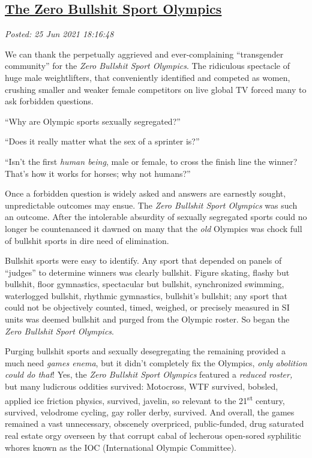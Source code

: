 %

\subsection*{\href{http://analyzethedatanotthedrivel.org/2021/06/25/the-zero-bullshit-sport-olympics/}{The Zero Bullshit Sport Olympics}}


\noindent\emph{Posted: 25 Jun 2021 18:16:48}
\vspace{6pt}

We can thank the perpetually aggrieved and ever-complaining
``transgender community'' for the \emph{Zero Bullshit Sport Olympics}.
The ridiculous spectacle of huge male weightlifters, that conveniently
identified and competed as women, crushing smaller and weaker female
competitors on live global TV forced many to ask forbidden questions.

``Why are Olympic sports sexually segregated?''

``Does it really matter what the sex of a sprinter is?''

``Isn't the first \emph{human being}, male or female, to cross the
finish line the winner? That's how it works for horses; why not
humans?''

Once a forbidden question is widely asked and answers are earnestly
sought, unpredictable outcomes may ensue. The \emph{Zero Bullshit Sport
Olympics} was such an outcome. After the intolerable absurdity of
sexually segregated sports could no longer be countenanced it dawned on
many that the \emph{old} Olympics was chock full of bullshit sports in
dire need of elimination.

Bullshit sports were easy to identify. Any sport that depended on panels
of ``judges'' to determine winners was clearly bullshit. Figure skating,
flashy but bullshit, floor gymnastics, spectacular but bullshit,
synchronized swimming, waterlogged bullshit, rhythmic gymnastics,
bullshit's bullshit; any sport that could not be objectively counted,
timed, weighed, or precisely measured in SI units was deemed bullshit
and purged from the Olympic roster. So began the \emph{Zero Bullshit
Sport Olympics}.

Purging bullshit sports and sexually desegregating the remaining
provided a much need \emph{games enema}, but it didn't completely fix
the Olympics, \emph{only abolition could do that}! Yes, the \emph{Zero
Bullshit Sport Olympics} featured a \emph{reduced roster,} but many
ludicrous oddities survived: Motocross, WTF survived, bobsled, applied
ice friction physics, survived, javelin, so relevant to the
21\textsuperscript{st} century, survived, velodrome cycling, gay roller
derby, survived. And overall, the games remained a vast unnecessary,
obscenely overpriced, public-funded, drug saturated real estate orgy
overseen by that corrupt cabal of lecherous open-sored syphilitic whores
known as the IOC (International Olympic Committee).

